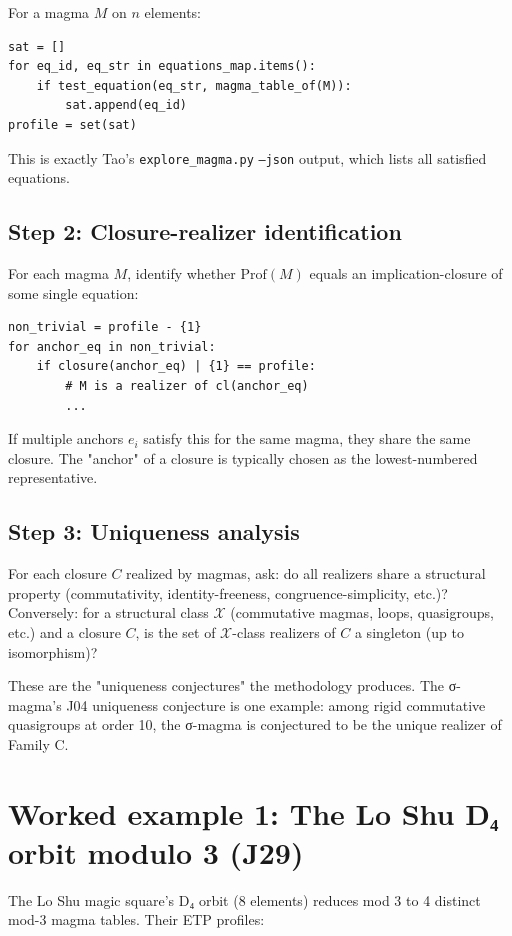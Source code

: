 \documentclass[11pt,reqno]{amsart}
\theoremstyle{plain}
\theoremstyle{definition}
\begin{document}
For a magma $M$ on $n$ elements:
\begin{verbatim}
sat = []
for eq_id, eq_str in equations_map.items():
    if test_equation(eq_str, magma_table_of(M)):
        sat.append(eq_id)
profile = set(sat)
\end{verbatim}

This is exactly Tao's \texttt{explore_magma.py} \texttt{--json} output, which lists all satisfied equations.

\subsection{Step 2: Closure-realizer identification}

For each magma $M$, identify whether $\mathrm{Prof}(M)$ equals an implication-closure of some single equation:
\begin{verbatim}
non_trivial = profile - {1}
for anchor_eq in non_trivial:
    if closure(anchor_eq) | {1} == profile:
        # M is a realizer of cl(anchor_eq)
        ...
\end{verbatim}

If multiple anchors $e_i$ satisfy this for the same magma, they share the same closure. The "anchor" of a closure is typically chosen as the lowest-numbered representative.

\subsection{Step 3: Uniqueness analysis}

For each closure $C$ realized by magmas, ask: do all realizers share a structural property (commutativity, identity-freeness, congruence-simplicity, etc.)? Conversely: for a structural class $\mathcal{X}$ (commutative magmas, loops, quasigroups, etc.) and a closure $C$, is the set of $\mathcal{X}$-class realizers of $C$ a singleton (up to isomorphism)?

These are the "uniqueness conjectures" the methodology produces. The σ-magma's J04 uniqueness conjecture is one example: among rigid commutative quasigroups at order 10, the σ-magma is conjectured to be the unique realizer of Family C.

\section{Worked example 1: The Lo Shu D₄ orbit modulo 3 (J29)}

The Lo Shu magic square's D₄ orbit (8 elements) reduces mod 3 to 4 distinct mod-3 magma tables. Their ETP profiles:
\end{document}
